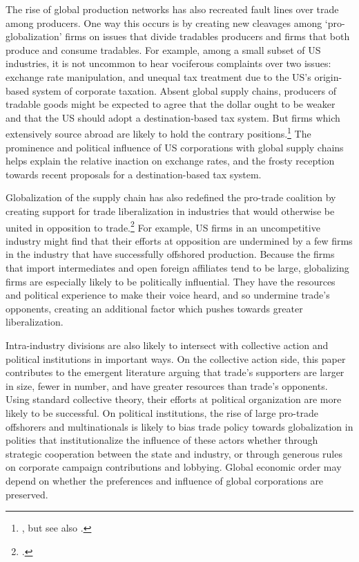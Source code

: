\documentclass[hidelinks,12pt,letter]{article}
\begin{document}
The rise of global production networks has also recreated fault lines over trade among producers. One way this occurs is by creating new cleavages among `pro-globalization' firms on issues that divide tradables producers and firms that both produce and consume tradables. For example, among a small subset of US industries, it is not uncommon to hear vociferous complaints over two issues: exchange rate manipulation, and unequal tax treatment due to the US's origin-based system of corporate taxation. Absent global supply chains, producers of tradable goods might be expected to agree that the dollar ought to be weaker and that the US should adopt a destination-based tax system. But firms which extensively source abroad are likely to hold the contrary positions.\footnote{\citealt{frieden2002real}, but see also \citealt{walter2008new}.} The prominence and political influence of US corporations with global supply chains helps explain the relative inaction on exchange rates, and the frosty reception towards recent proposals for a destination-based tax system.

Globalization of the supply chain has also redefined the pro-trade coalition by creating support for trade liberalization in industries that would otherwise be united in opposition to trade.\footnote{\citealt{osgood2017industrial}.} For example, US firms in an uncompetitive industry might find that their efforts at opposition are undermined by a few firms in the industry that have successfully offshored production. Because the firms that import intermediates and open foreign affiliates tend to be large, globalizing firms are especially likely to be politically influential. They have the resources and political experience to make their voice heard, and so undermine trade's opponents, creating an additional factor which pushes towards greater liberalization. %

Intra-industry divisions are also likely to intersect with collective action and political institutions in important ways. On the collective action side, this paper contributes to the emergent literature arguing that trade's supporters are larger in size, fewer in number, and have greater resources than trade's opponents. Using standard collective theory, their efforts at political organization are more likely to be successful. On political institutions, the rise of large pro-trade offshorers and multinationals is likely to bias trade policy towards globalization in polities that institutionalize the influence of these actors whether through strategic cooperation between the state and industry, or through generous rules on corporate campaign contributions and lobbying. Global economic order may depend on whether the preferences and influence of global corporations are preserved. %
\end{document}
